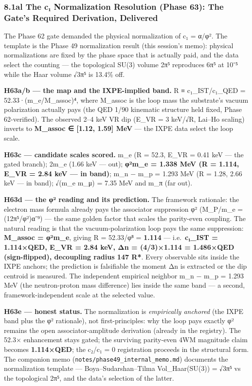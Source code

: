 \documentclass[
]{article}
\begin{document}
\subsubsection{8.1al The c₁ Normalization Resolution (Phase 63): The
Gate's Required Derivation,
Delivered}\label{al-the-cux2081-normalization-resolution-phase-63-the-gates-required-derivation-delivered}

The Phase 62 gate demanded the physical normalization of c₁ = α/φ². The
template is the Phase 49 normalization result (this session's memo):
physical normalizations are fixed by the phase space that is actually
paid, and the data select the counting --- the topological SU(3) volume
2π⁵ reproduces 6π⁵ at 10⁻⁵ while the Haar volume √3π⁵ is 13.4\% off.

\textbf{H63a/b --- the map and the IXPE-implied band.} R ≡
c₁\_IST/c₁\_QED = 52.33·(m\_e/M\_assoc)⁴, where M\_assoc is the loop
mass the substrate's vacuum polarization actually pays (the QED 1/90
kinematic structure held fixed, Phase 62-verified). The observed 2--4
keV VR dip (E\_VR = 3 keV/√R, Lai--Ho scaling) inverts to
\textbf{M\_assoc ∈ {[}1.12, 1.59{]} MeV} --- the IXPE data select the
loop scale.

\textbf{H63c --- candidate scales scored.} m\_e (R = 52.3, E\_VR = 0.41
keV --- the gated branch); 2m\_e (1.66 keV --- out); \textbf{φ²m\_e =
1.338 MeV (R = 1.114, E\_VR = 2.84 keV --- in band)}; m\_n − m\_p =
1.293 MeV (R = 1.28, 2.66 keV --- in band); √(m\_e m\_μ) = 7.35 MeV and
m\_π (far out).

\textbf{H63d --- the φ² reading and its prediction.} The framework
rationale: the electron mass formula already pays the associator
suppression φ² (M\_P/m\_e = (12π⁵/φ²)α⁻⁹) --- the same golden factor
that scales the parity-even coupling. The natural reading is that the
vacuum-polarization loop pays the same suppression: \textbf{M\_assoc =
φ²m\_e}, giving R = 52.33/φ⁸ = \textbf{1.114} --- i.e.~\textbf{c₁\_IST =
1.114×QED, E\_VR = 2.84 keV, \textbar Δn\textbar{} = (4/3)×1.114 =
1.486×QED (sign-flipped), decoupling radius 147 R*}. Every observable
sits inside the IXPE anchors; the prediction is falsifiable the moment
\textbar Δn\textbar{} is extracted or the dip centroid is measured. The
independent empirical neighbor m\_n − m\_p = 1.293 MeV (the
neutron-proton mass difference) lies inside the same band --- a second,
framework-independent scale at the selected value.

\textbf{H63e --- honest status.} The normalization is \emph{empirically
anchored} (the IXPE band plus the φ² rationale), not first-principles:
why the loop pays exactly φ² remains the open associator-amplitude
derivation (already in the registry). The 52.3× enhancement stays gated;
the surviving parity-even 4WM magnitude claim becomes
\textbf{1.114×QED}; the c₂/c₁ = 0 registration proceeds in the
structural form. The companion memo
(\texttt{notes/phase49\_internal\_memo.md}) documents the normalization
template --- Boya--Sudarshan--Tilma Vol\_Haar(SU(3)) = √3π⁵ vs the
topological 2π⁵, and the data's selection of the latter.
\end{document}
